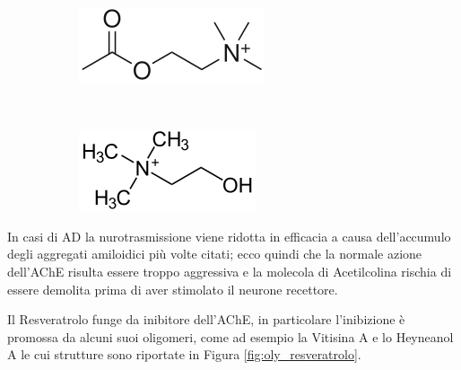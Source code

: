 \documentclass[a4paper, 12pt]{article}
\begin{document}
\begin{figure}[H]
	\centering
	\begin{subfigure}[b]{0.4\linewidth}
		\includegraphics[width=\linewidth]{immagini/acetilcolina.png}
	\end{subfigure}
	~
	\begin{subfigure}[b]{0.4\linewidth}
		\includegraphics[width=\linewidth]{immagini/colina.png}
	\end{subfigure}
	\label{fig:coline}
\end{figure}

In casi di AD la nurotrasmissione viene ridotta in efficacia a causa dell'accumulo degli aggregati amiloidici più volte citati; ecco quindi che la normale azione dell'AChE risulta essere troppo aggressiva e la molecola di Acetilcolina rischia di essere demolita prima di aver stimolato il neurone recettore.

Il Resveratrolo funge da inibitore dell'AChE, in particolare l'inibizione è promossa da alcuni suoi oligomeri, come ad esempio la Vitisina A e lo Heyneanol A le cui strutture sono riportate in Figura \ref{fig:oly_resveratrolo}.
\end{document}
